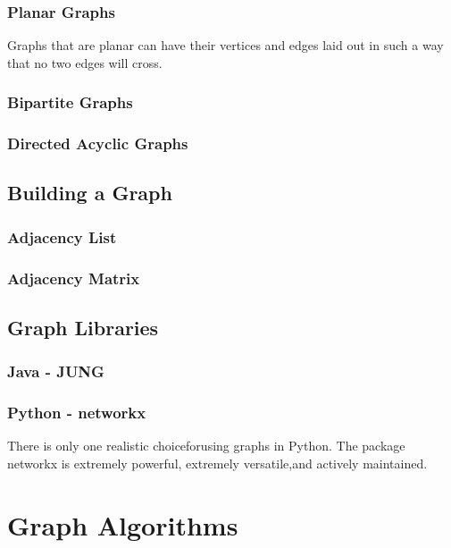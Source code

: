 \documentclass[10pt,a4paper]{book}
\begin{document}
\subsection{Planar Graphs}
Graphs that are planar can have their vertices and edges laid out in such a way that no two edges will cross.



\subsection{Bipartite Graphs}

\subsection{Directed Acyclic Graphs}


\section{Building a Graph}

\subsection{Adjacency List}
\subsection{Adjacency Matrix}

\section{Graph Libraries}

\subsection{Java - JUNG}

\subsection{Python - networkx}

There is only one realistic choiceforusing graphs in Python.  The package networkx is extremely powerful, extremely versatile,and actively maintained.



\chapter{Graph Algorithms}
\end{document}
